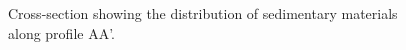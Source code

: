 
\begin{figure}[H]
	\centering
	\framebox{\rule{0pt}{5cm}\rule{\textwidth}{0pt}}
	\captionsetup{justification=centering}
	\caption[Cross-section]{
		Cross-section showing the distribution of sedimentary materials along profile AA'.
		\label{fig:crosssection}
	}	
\end{figure}